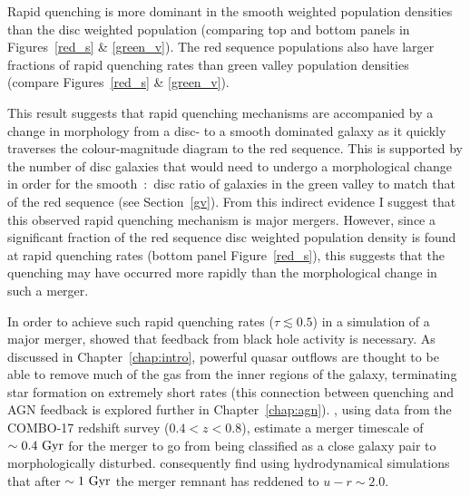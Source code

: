 Rapid quenching is more dominant in the smooth weighted population densities than the disc weighted population (comparing top and bottom panels in Figures~\ref{red_s} \& \ref{green_v}). The red sequence populations also have larger fractions of rapid quenching rates than green valley population densities (compare Figures~\ref{red_s} \& \ref{green_v}).

This result suggests that rapid quenching mechanisms are accompanied by a change in morphology from a disc- to a smooth dominated galaxy as it quickly traverses the colour-magnitude diagram to the red sequence. This is supported by the number of disc galaxies that would need to undergo a morphological change in order for the smooth~:~disc ratio of galaxies in the green valley to match that of the red sequence (see Section~\ref{gv}). From this indirect evidence I suggest that this observed rapid quenching mechanism is major mergers. However, since a significant fraction of the red sequence disc weighted population density is found at rapid quenching rates (bottom panel Figure~\ref{red_s}), this suggests that the quenching may have occurred more rapidly than the morphological change in such a merger.


In order to achieve such rapid quenching rates ($\tau \lesssim 0.5$) in a simulation of a major merger, \citet*{springel05b} showed that feedback from black hole activity is necessary. As discussed in Chapter~\ref{chap:intro}, powerful quasar outflows are thought to be able to remove much of the gas from the inner regions of the galaxy, terminating star formation on extremely short rates (this connection between quenching and AGN feedback is explored further in Chapter~\ref{chap:agn}). \citet{bell06}, using data from the COMBO-17 redshift survey ($0.4 < z < 0.8$), estimate a merger timescale of $\sim 0.4~\rm{Gyr}$ for the merger to go from being classified as a close galaxy pair to morphologically disturbed. \citet*{springel05b} consequently find using hydrodynamical simulations that after $\sim1~\rm{Gyr}$ the merger remnant has reddened to $u-r \sim 2.0$. 

